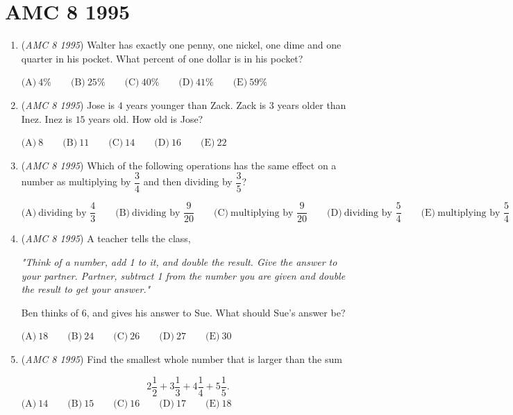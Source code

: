 \section{AMC 8 1995}
        \begin{enumerate}
        	\item (\textit{AMC 8 1995}) Walter has exactly one penny, one nickel, one dime and one quarter in his pocket.  What percent of one dollar is in his pocket?


 $\text{(A)}\ 4\% \qquad \text{(B)}\ 25\% \qquad \text{(C)}\ 40\% \qquad \text{(D)}\ 41\% \qquad \text{(E)}\ 59\%$


	\item (\textit{AMC 8 1995}) Jose is $4$ years younger than Zack.  Zack is $3$ years older than Inez.  Inez is $15$ years old.  How old is Jose?


 $\text{(A)}\ 8 \qquad \text{(B)}\ 11 \qquad \text{(C)}\ 14 \qquad \text{(D)}\ 16 \qquad \text{(E)}\ 22$


	\item (\textit{AMC 8 1995}) Which of the following operations has the same effect on a number as multiplying by $\dfrac{3}{4}$ and then dividing by $\dfrac{3}{5}$?


 $\text{(A)}\ \text{dividing by }\dfrac{4}{3} \qquad \text{(B)}\ \text{dividing by }\dfrac{9}{20} \qquad \text{(C)}\ \text{multiplying by }\dfrac{9}{20} \qquad \text{(D)}\ \text{dividing by }\dfrac{5}{4} \qquad \text{(E)}\ \text{multiplying by }\dfrac{5}{4}$


	\item (\textit{AMC 8 1995}) A teacher tells the class,


 
\textit{"Think of a number, add 1 to it, and double the result.  Give the answer to your partner.  Partner, subtract 1 from the number you are given and double the result to get your answer."}


 


 Ben thinks of $6$, and gives his answer to Sue.  What should Sue's answer be?


 $\text{(A)}\ 18 \qquad \text{(B)}\ 24 \qquad \text{(C)}\ 26 \qquad \text{(D)}\ 27 \qquad \text{(E)}\ 30$


	\item (\textit{AMC 8 1995}) Find the smallest whole number that is larger than the sum


 
 \[2\dfrac{1}{2}+3\dfrac{1}{3}+4\dfrac{1}{4}+5\dfrac{1}{5}.\]
$\text{(A)}\ 14 \qquad \text{(B)}\ 15 \qquad \text{(C)}\ 16 \qquad \text{(D)}\ 17 \qquad \text{(E)}\ 18$



\end{enumerate}

